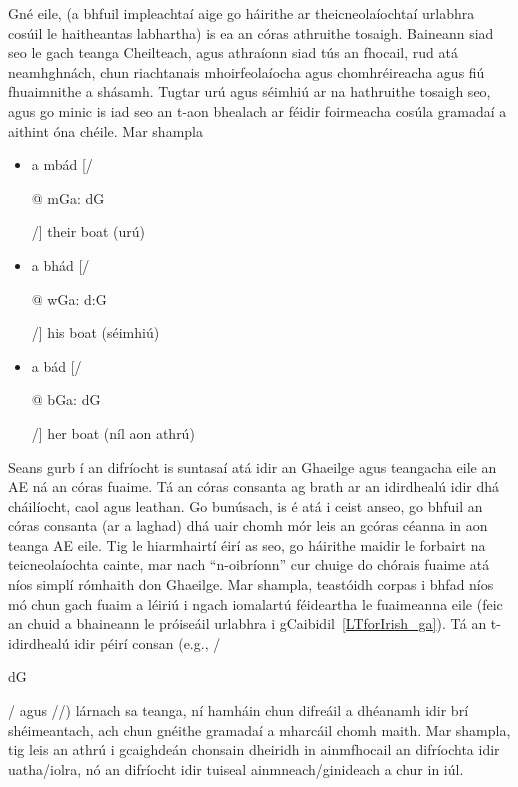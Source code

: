 \begin{multicols}{2}
Gné eile, (a bhfuil impleachtaí aige go háirithe ar theicneolaíochtaí urlabhra cosúil le haitheantas labhartha) is ea an córas athruithe tosaigh. Baineann siad seo le gach teanga Cheilteach, agus athraíonn siad tús an fhocail, rud atá neamhghnách, chun riachtanais mhoirfeolaíocha agus chomhréireacha agus fiú fhuaimnithe a shásamh. Tugtar urú agus séimhiú ar na hathruithe tosaigh seo, agus go minic is iad seo an t-aon bhealach ar féidir foirmeacha cosúla gramadaí a aithint óna chéile. Mar shampla

\begin{itemize}
\item a mbád [/\begin{IPA}@ m\super Ga: d\super G\end{IPA}/] their boat (urú)
\item a bhád [/\begin{IPA}@ w\super Ga: d:G\end{IPA}/] his boat (séimhiú)
\item a bád [/\begin{IPA}@ b\super Ga: d\super G\end{IPA}/] her boat (níl aon athrú)
\end{itemize}

Seans gurb í an difríocht is suntasaí atá idir an Ghaeilge agus teangacha eile an AE ná an córas fuaime. Tá an córas consanta ag brath ar an idirdhealú idir dhá cháilíocht, caol agus leathan. Go bunúsach, is é atá i ceist anseo, go bhfuil an córas consanta (ar a laghad) dhá uair chomh mór leis an gcóras céanna in aon teanga AE eile.  Tig le hiarmhairtí éirí as seo, go háirithe maidir le forbairt na teicneolaíochta cainte, mar nach “n-oibríonn” cur chuige do chórais fuaime atá níos simplí rómhaith don Ghaeilge. Mar shampla, teastóidh corpas i bhfad níos mó chun gach fuaim a léiriú i ngach iomalartú féideartha le fuaimeanna eile (feic an chuid a bhaineann le próiseáil urlabhra i gCaibidil~\ref{LTforIrish_ga}). Tá an t-idirdhealú idir péirí consan (e.g., /\begin{IPA}d\super G\end{IPA}/ agus //) lárnach sa teanga, ní hamháin chun difreáil a dhéanamh idir brí shéimeantach, ach chun gnéithe gramadaí a mharcáil chomh maith. Mar shampla, tig leis an athrú i gcaighdeán chonsain dheiridh in ainmfhocail an difríochta idir uatha/iolra, nó an difríocht idir tuiseal ainmneach/ginideach a chur in iúl.



\end{multicols}
